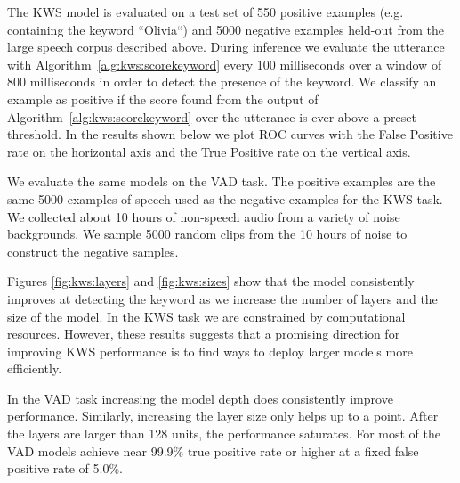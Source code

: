 The KWS model is evaluated on a test set of 550 positive examples (e.g.
containing the keyword ``Olivia``) and 5000 negative examples held-out from the
large speech corpus described above. During inference we evaluate the utterance
with Algorithm~\ref{alg:kws:scorekeyword} every 100 milliseconds over a window
of 800 milliseconds in order to detect the presence of the keyword. We classify
an example as positive if the score found from the output of
Algorithm~\ref{alg:kws:scorekeyword} over the utterance is ever above a preset
threshold.  In the results shown below we plot ROC curves with the False
Positive rate on the horizontal axis and the True Positive rate on the vertical
axis.

We evaluate the same models on the VAD task. The positive examples are the same
5000 examples of speech used as the negative examples for the KWS task. We
collected about 10 hours of non-speech audio from a variety of noise
backgrounds. We sample 5000 random clips from the 10 hours of noise to
construct the negative samples.

Figures \ref{fig:kws:layers} and \ref{fig:kws:sizes} show that the model
consistently improves at detecting the keyword as we increase the number of
layers and the size of the model. In the KWS task we are constrained by
computational resources. However, these results suggests that a promising
direction for improving KWS performance is to find ways to deploy larger models
more efficiently. 

In the VAD task increasing the model depth does consistently improve
performance. Similarly, increasing the layer size only helps up to a point.
After the layers are larger than 128 units, the performance saturates. For most
of the VAD models achieve near 99.9\% true positive rate or higher at a fixed
false positive rate of 5.0\%.

